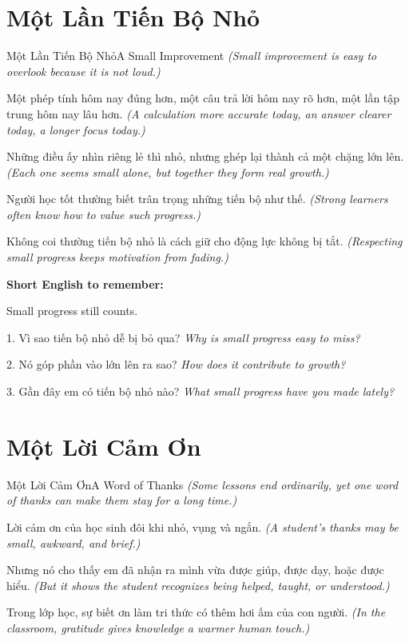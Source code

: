 \section{Một Lần Tiến Bộ Nhỏ}
\begin{truyen}{Một Lần Tiến Bộ Nhỏ}{A Small Improvement}
\textit{(Small improvement is easy to overlook because it is not loud.)}

Một phép tính hôm nay đúng hơn, một câu trả lời hôm nay rõ hơn, một lần tập trung hôm nay lâu hơn.
\textit{(A calculation more accurate today, an answer clearer today, a longer focus today.)}

Những điều ấy nhìn riêng lẻ thì nhỏ, nhưng ghép lại thành cả một chặng lớn lên.
\textit{(Each one seems small alone, but together they form real growth.)}

Người học tốt thường biết trân trọng những tiến bộ như thế.
\textit{(Strong learners often know how to value such progress.)}
\end{truyen}

\begin{baihoc}
Không coi thường tiến bộ nhỏ là cách giữ cho động lực không bị tắt.
\textit{(Respecting small progress keeps motivation from fading.)}
\end{baihoc}

\begin{ghinhoanh}
\textbf{Short English to remember:}

Small progress still counts.

\end{ghinhoanh}

\begin{tuhocnhanh}
1. Vì sao tiến bộ nhỏ dễ bị bỏ qua? \textit{Why is small progress easy to miss?}

2. Nó góp phần vào lớn lên ra sao? \textit{How does it contribute to growth?}

3. Gần đây em có tiến bộ nhỏ nào? \textit{What small progress have you made lately?}
\end{tuhocnhanh}
\ngancach

\section{Một Lời Cảm Ơn}
\begin{truyen}{Một Lời Cảm Ơn}{A Word of Thanks}
\textit{(Some lessons end ordinarily, yet one word of thanks can make them stay for a long time.)}

Lời cảm ơn của học sinh đôi khi nhỏ, vụng và ngắn.
\textit{(A student's thanks may be small, awkward, and brief.)}

Nhưng nó cho thấy em đã nhận ra mình vừa được giúp, được dạy, hoặc được hiểu.
\textit{(But it shows the student recognizes being helped, taught, or understood.)}

Trong lớp học, sự biết ơn làm tri thức có thêm hơi ấm của con người.
\textit{(In the classroom, gratitude gives knowledge a warmer human touch.)}
\end{truyen}

